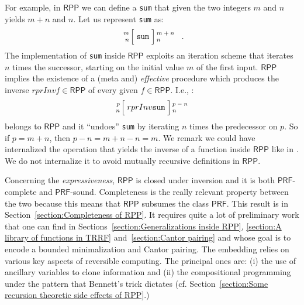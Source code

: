 \documentclass[runningheads]{llncs}
\newcommand{\RPP}{\textsf{RPP}\xspace}
\newcommand{\PRF}{\textsf{PRF}\xspace}
\begin{document}
For example, in $ \RPP $ we can define a \texttt{sum} that given the two integers $ m $ and $ n $
yields $ m+n $ and $ n $. Let us represent \texttt{sum} as:
\begin{align}
    \label{align:sum example}
    \arraycolsep=1.4pt
    \begin{array}{rcl}
        \left. {\scriptsize \begin{array}{r} m    \\ n \end{array}} \right[
        & \texttt{sum} &
        \left] {\scriptsize \begin{array}{l} m + n\\ n \end{array} } \right.
    \end{array}
    \enspace .
\end{align}
The implementation of \texttt{sum} inside $ \RPP $ exploits an iteration scheme that iterates $ n $
times the successor, starting on the initial value $ m $ of the first input.
$ \RPP $ implies the existence of a (meta and) \emph{effective} procedure which produces
the inverse $ rprInv{f}\in\RPP $ of every given $ f\in\RPP $.
I.e., :
\begin{align}
    \label{align:diff example}
    \arraycolsep=1.4pt
    \begin{array}{rcl}
        \left. {\scriptsize \begin{array}{r} p    \\ n \end{array}} \right[
        & rprInv{\texttt{sum}}
        &
        \left] {\scriptsize \begin{array}{l} p - n\\ n \end{array} } \right.
    \end{array}
\end{align}
belongs to $ \RPP $ and it ``undoes'' \texttt{sum} by iterating $ n $ times
the predecessor on $ p $. So if $ p = m + n $, then $ p - n = m + n - n = m$.
We remark we could have internalized the operation that yields the inverse of a
function inside $\RPP$ like in \cite{matos03tcs}. We do not internalize it
to avoid mutually recursive definitions in $ \RPP $.

Concerning the \emph{expressiveness}, $ \RPP $ is closed under inversion and it is both $ \PRF $-complete and $ \PRF $-sound.
Completeness is the really relevant property between the two because this means that
$ \RPP $ subsumes the class $ \PRF $.
This result is in  Section~\ref{section:Completeness of RPP}. It requires quite a lot
of preliminary work that one can find in Sections~\ref{section:Generalizations inside RPP},
\ref{section:A library of functions in TRRF} and~\ref{section:Cantor pairing}
and whose goal is to encode a bounded minimalization and Cantor pairing.
The embedding relies on various key aspects of reversible computing. The principal
ones are:  (i) the use of ancillary variables to clone information
and (ii) the compositional programming under the pattern that Bennett's trick dictates
(cf. Section~\ref{section:Some recursion theoretic side effects of RPP}.)
\end{document}
